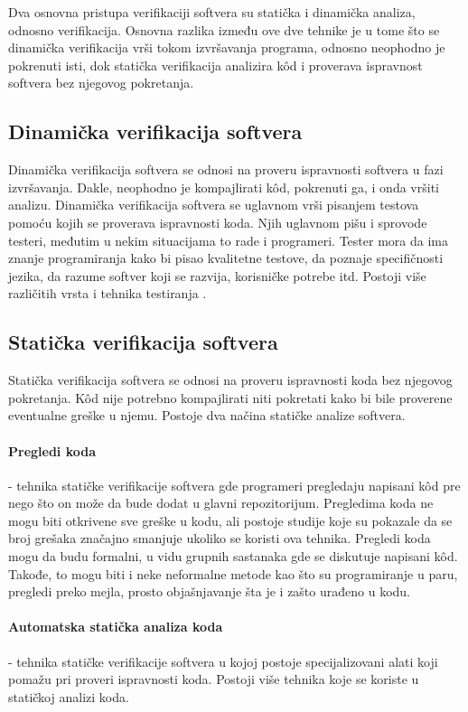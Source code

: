 \documentclass[12pt,oneside]{memoir}
\begin{document}
Dva osnovna pristupa verifikaciji softvera su statička i dinamička analiza, odnosno verifikacija. Osnovna razlika između ove dve tehnike je u tome što se dinamička verifikacija vrši tokom izvršavanja programa, odnosno neophodno je pokrenuti isti, dok statička verifikacija analizira k\^od i proverava ispravnost softvera bez njegovog pokretanja.

\subsection{Dinamička verifikacija softvera}
Dinamička verifikacija softvera se odnosi na proveru ispravnosti softvera u fazi izvršavanja. Dakle, neophodno je kompajlirati k\^od, pokrenuti ga, i onda vršiti analizu. Dinamička verifikacija softvera se uglavnom vrši pisanjem testova pomoću kojih se proverava ispravnosti koda. Njih uglavnom pišu i sprovode testeri, međutim u nekim situacijama to rade i programeri. Tester mora da ima znanje programiranja kako bi pisao kvalitetne testove, da poznaje specifičnosti jezika, da razume softver koji se razvija, korisničke potrebe itd. Postoji više različitih vrsta i tehnika testiranja \cite{testing_book}. 

\subsection{Statička verifikacija softvera}
Statička verifikacija softvera se odnosi na proveru ispravnosti koda bez njegovog pokretanja. K\^od nije potrebno kompajlirati niti pokretati kako bi bile proverene eventualne greške u njemu. Postoje dva načina statičke analize softvera.

\paragraph{Pregledi koda} - tehnika statičke verifikacije softvera gde programeri pregledaju napisani k\^od pre nego što on može da bude dodat u glavni repozitorijum. Pregledima koda ne mogu biti otkrivene sve greške u kodu, ali postoje studije \cite{code_review} koje su pokazale da se broj grešaka značajno smanjuje ukoliko se koristi ova tehnika. Pregledi koda mogu da budu formalni, u vidu grupnih sastanaka gde se diskutuje napisani k\^od. Takođe, to mogu biti i neke neformalne metode kao što su programiranje u paru, pregledi preko mejla, prosto objašnjavanje šta je i zašto urađeno u kodu.

\paragraph{Automatska statička analiza koda} - tehnika statičke verifikacije softvera u kojoj postoje specijalizovani alati koji pomažu pri proveri ispravnosti koda. Postoji više tehnika koje se koriste u statičkoj analizi koda. 
\end{document}
